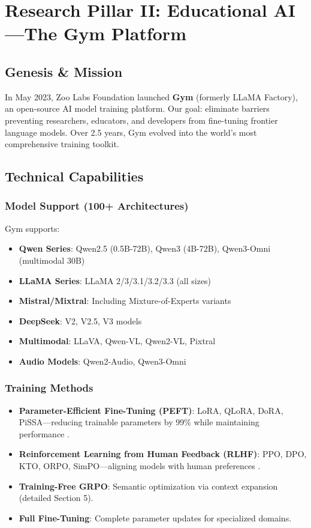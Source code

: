 \section{Research Pillar II: Educational AI—The Gym Platform}


\subsection{Genesis \& Mission}

In May 2023, Zoo Labs Foundation launched \textbf{Gym} (formerly LLaMA Factory), an open-source AI model training platform. Our goal: eliminate barriers preventing researchers, educators, and developers from fine-tuning frontier language models. Over 2.5 years, Gym evolved into the world's most comprehensive training toolkit.

\subsection{Technical Capabilities}

\subsubsection{Model Support (100+ Architectures)}
Gym supports:
\begin{itemize}
    \item \textbf{Qwen Series}: Qwen2.5 (0.5B-72B), Qwen3 (4B-72B), Qwen3-Omni (multimodal 30B) \citep{alibaba2024qwen3}
    \item \textbf{LLaMA Series}: LLaMA 2/3/3.1/3.2/3.3 (all sizes) \citep{meta2024llama3}
    \item \textbf{Mistral/Mixtral}: Including Mixture-of-Experts variants
    \item \textbf{DeepSeek}: V2, V2.5, V3 models \citep{deepseek2024v3}
    \item \textbf{Multimodal}: LLaVA, Qwen-VL, Qwen2-VL, Pixtral
    \item \textbf{Audio Models}: Qwen2-Audio, Qwen3-Omni
\end{itemize}

\subsubsection{Training Methods}
\begin{itemize}
    \item \textbf{Parameter-Efficient Fine-Tuning (PEFT)}: LoRA, QLoRA, DoRA, PiSSA—reducing trainable parameters by 99\% while maintaining performance \citep{hu2021lora, dettmers2023qlora}.
    \item \textbf{Reinforcement Learning from Human Feedback (RLHF)}: PPO, DPO, KTO, ORPO, SimPO—aligning models with human preferences \citep{ouyang2022training, rafailov2023dpo}.
    \item \textbf{Training-Free GRPO}: Semantic optimization via context expansion (detailed Section 5).
    \item \textbf{Full Fine-Tuning}: Complete parameter updates for specialized domains.
\end{itemize}

